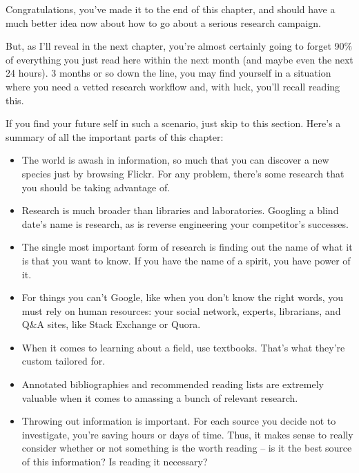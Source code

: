 Congratulations, you've made it to the end of this chapter, and should
have a much better idea now about how to go about a serious research campaign.

But, as I'll reveal in the next chapter, you're almost certainly going to forget
90\% of everything you just read here within the next month (and maybe even the next 24 hours). 3 months or so down
the line, you may find yourself in a situation where you need a vetted research
workflow and, with luck, you'll recall reading this.

If you find your future self in such a scenario, just skip to this
section. Here's a summary of all the important parts of this chapter:

\begin{itemize}
\item The world is awash in information, so much that you can discover a new species
just by browsing Flickr. For any problem, there's some research that you should
be taking advantage of.

\item Research is much broader than libraries and laboratories. Googling a blind
date's name is research, as is reverse engineering your competitor's successes.

\item The single most important form of research is finding out the name of what it
is that you want to know. If you have the name of a spirit, you have power of
it.

\item For things you can't Google, like when you don't know the right words, you
must rely on human resources: your social network, experts, librarians, and Q\&A
sites, like Stack Exchange or Quora.

\item When it comes to learning about a field, use textbooks. That's what they're
custom tailored for.

\item Annotated bibliographies and recommended reading lists are extremely valuable
when it comes to amassing a bunch of relevant research.

\item Throwing out information is important. For each source you decide not to
investigate, you're saving hours or days of time. Thus, it makes sense to really
consider whether or not something is the worth reading -- is it the best source
of this information? Is reading it necessary?


\end{itemize}
